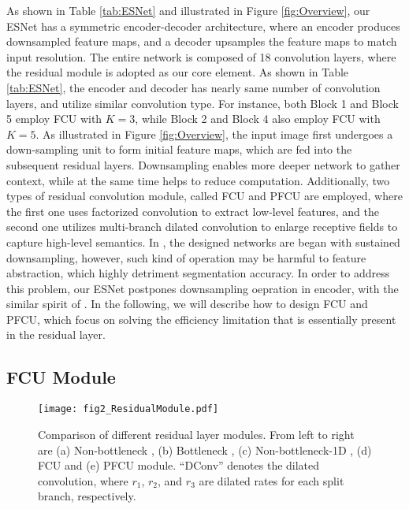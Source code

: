 \documentclass[runningheads]{llncs}
\begin{document}
As shown in Table \ref{tab:ESNet} and illustrated in Figure \ref{fig:Overview}, our ESNet has a symmetric encoder-decoder architecture, where an encoder produces downsampled feature maps, and a decoder upsamples the feature maps to match input resolution. The entire network is composed of 18 convolution layers, where the residual module is adopted as our core element. As shown in Table \ref{tab:ESNet}, the encoder and decoder has nearly same number of convolution layers, and utilize similar convolution type. For instance, both Block 1 and Block 5 employ FCU with $K =3$, while Block 2 and Block 4 also employ FCU with $K =5$. As illustrated in Figure \ref{fig:Overview}, the input image first undergoes a down-sampling unit to form initial feature maps, which are fed into the subsequent residual layers. Downsampling enables more deeper network to gather context, while at the same time helps to reduce computation. Additionally, two types of residual convolution module, called FCU and PFCU are employed, where the first one uses factorized convolution to extract low-level features, and the second one utilizes multi-branch dilated convolution to enlarge receptive fields to capture high-level semantics. In \cite{Paszke2016enet,Romera2018erfnet,fast2019zhang}, the designed networks are began with sustained downsampling, however, such kind of operation may be harmful to feature abstraction, which highly detriment segmentation accuracy. In order to address this problem, our ESNet postpones downsampling oepration in encoder, with the similar spirit of \cite{Szegedy2016rethinking}. In the following, we will describe how to design FCU and PFCU, which focus on solving the efficiency limitation that is essentially present in the residual layer.

\subsection{FCU Module}\label{sec:FCU}

\begin{figure}[!t]
\centerline{\texttt{[image: fig2\_ResidualModule.pdf]}}
\caption{Comparison of different residual layer modules. From left to right are (a) Non-bottleneck \cite{he2016deep}, (b) Bottleneck \cite{Paszke2016enet}, (c) Non-bottleneck-1D \cite{Romera2018erfnet}, (d) FCU and (e) PFCU module. ``DConv'' denotes the dilated convolution, where $r_1$, $r_2$, and $r_3$ are dilated rates for each split branch, respectively.} \label{fig:ResidualModule}
\end{figure}
\end{document}
